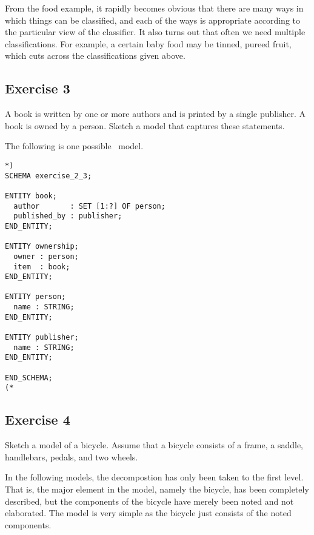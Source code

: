 \documentclass{article}
\newenvironment{code}{}{}
\begin{document}
    From the food example, it rapidly becomes obvious that there are many 
ways in which things can be classified, and each of the ways is 
appropriate according to the particular view of the classifier. 
It also turns out that often we need multiple classifications. 
For example, a certain baby food may be tinned, pureed
fruit, which cuts across the classifications given above.

\subsection{Exercise 3}

\begin{itshape}
A book is written by one or more authors and is printed by a single
publisher. A book is owned by a person. Sketch a model 
that captures these statements.
\end{itshape}


    The following is one possible \Express\ model.
\begin{code}
\begin{verbatim}
*)
SCHEMA exercise_2_3;

ENTITY book;
  author       : SET [1:?] OF person;
  published_by : publisher;
END_ENTITY;

ENTITY ownership;
  owner : person;
  item  : book;
END_ENTITY;

ENTITY person;
  name : STRING;
END_ENTITY;

ENTITY publisher;
  name : STRING;
END_ENTITY;

END_SCHEMA;
(*
\end{verbatim}
\end{code}

\subsection{Exercise 4}

\begin{itshape}
Sketch a model of a bicycle. Assume that a bicycle consists of a 
frame, a saddle, handlebars, pedals, and two wheels.
\end{itshape}

    In the following models, the decompostion has only been taken to the first
level. That is, the major element in the model, namely the bicycle, has
been completely described, but the components of the bicycle have merely been
noted and not elaborated. The model is very simple as the bicycle just consists
of the noted components.
\end{document}
